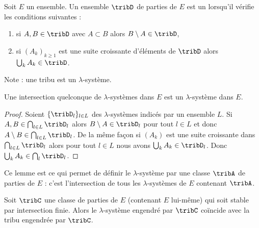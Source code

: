 \begin{definition}      \label{DefRECXooWwYgej}
    Soit \( E\) un ensemble. Un ensemble \( \tribD\) de parties de \( E\) est un  lorsqu'il vérifie les conditions suivantes :
    \begin{enumerate}
        \item
            si \( A,B\in\tribD\) avec \( A\subset B\) alors \( B\setminus A\in \tribD\),
        \item
            si \( (A_k)_{k\geq 1}\) est une suite croissante d'éléments de \( \tribD\) alors \( \bigcup_kA_k\in\tribD\).
    \end{enumerate}
\end{definition}
Note : une tribu est un \( \lambda\)-système.

\begin{lemma}
    Une intersection quelconque de \( \lambda\)-systèmes dans \( E\) est un \( \lambda\)-système dans \( E\).
\end{lemma}

\begin{proof}
    Soient \( \{ \tribD_l \}_{l\in L}\) des \( \lambda\)-systèmes indicés par un ensemble \( L\). Si \( A,B\in\bigcap_{l\in L}\tribD_l\) alors \( B\setminus A\in\tribD_l\) pour tout \( l\in L\) et donc \( A\setminus B\in\bigcap_{l\in L}\tribD_l\). De la même façon si \( (A_k)\) est une suite croissante dans \( \bigcap_{l\in L}\tribD_l\) alors pour tout \( l\in L\) nous avons \( \bigcup_kA_k\in\tribD_l\). Donc \( \bigcup_kA_k\in\bigcap_l\tribD_l\).
\end{proof}
Ce lemme est ce qui permet de définir le \( \lambda\)-système  par une classe \( \tribA\) de parties de \( E\) : c'est l'intersection de tous les \( \lambda\)-systèmes de \( E\) contenant \( \tribA\).

\begin{lemma}   \label{LemLUmopaZ}
    Soit \( \tribC\) une classe de parties de \( E\) (contenant \( E\) lui-même) qui soit stable par intersection finie. Alors le \( \lambda\)-système engendré par \( \tribC\) coïncide avec la tribu engendrée par \( \tribC\).
\end{lemma}

